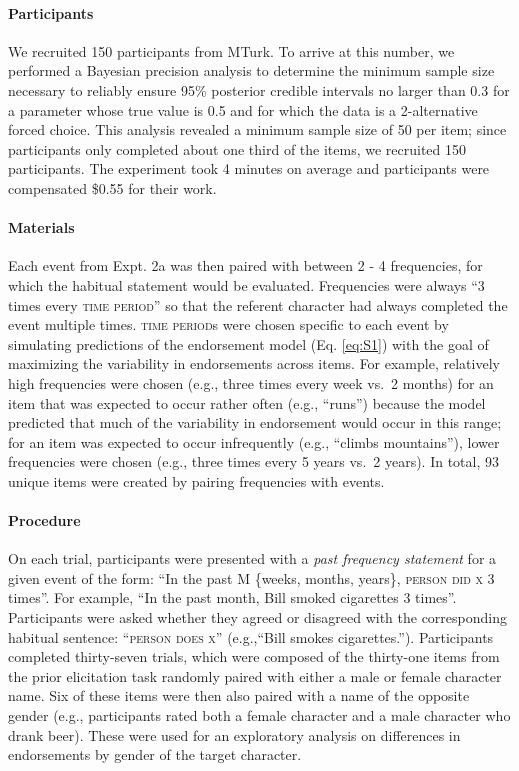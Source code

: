 \documentclass[english,floatsintext,man]{apa6}
\theoremstyle{definition}
\theoremstyle{definition}
\theoremstyle{definition}
\theoremstyle{remark}
\begin{document}
\paragraph{Participants}\label{participants-3}

We recruited 150 participants from MTurk. To arrive at this number, we
performed a Bayesian precision analysis to determine the minimum sample
size necessary to reliably ensure 95\% posterior credible intervals no
larger than 0.3 for a parameter whose true value is 0.5 and for which
the data is a 2-alternative forced choice. This analysis revealed a
minimum sample size of 50 per item; since participants only completed
about one third of the items, we recruited 150 participants. The
experiment took 4 minutes on average and participants were compensated
\$0.55 for their work.

\paragraph{Materials}\label{materials-1}

Each event from Expt. 2a was then paired with between 2 - 4 frequencies,
for which the habitual statement would be evaluated. Frequencies were
always \enquote{3 times every \textsc{time period}} so that the referent
character had always completed the event multiple times.
\textsc{time period}s were chosen specific to each event by simulating
predictions of the endorsement model (Eq. \ref{eq:S1}) with the goal of
maximizing the variability in endorsements across items. For example,
relatively high frequencies were chosen (e.g., three times every week
vs.~2 months) for an item that was expected to occur rather often (e.g.,
\enquote{runs}) because the model predicted that much of the variability
in endorsement would occur in this range; for an item was expected to
occur infrequently (e.g., \enquote{climbs mountains}), lower frequencies
were chosen (e.g., three times every 5 years vs.~2 years). In total, 93
unique items were created by pairing frequencies with events.

\paragraph{Procedure}\label{procedure-1}

On each trial, participants were presented with a
\emph{past frequency statement} for a given event of the form:
\enquote{In the past M \{weeks, months, years\}, \textsc{person}
\textsc{did x} 3 times}. For example, \enquote{In the past month, Bill
smoked cigarettes 3 times}. Participants were asked whether they agreed
or disagreed with the corresponding habitual sentence:
\enquote{\textsc{person does x}} (e.g.,\enquote{Bill smokes
cigarettes.}). Participants completed thirty-seven trials, which were
composed of the thirty-one items from the prior elicitation task
randomly paired with either a male or female character name. Six of
these items were then also paired with a name of the opposite gender
(e.g., participants rated both a female character and a male character
who drank beer). These were used for an exploratory analysis on
differences in endorsements by gender of the target character.
\end{document}
